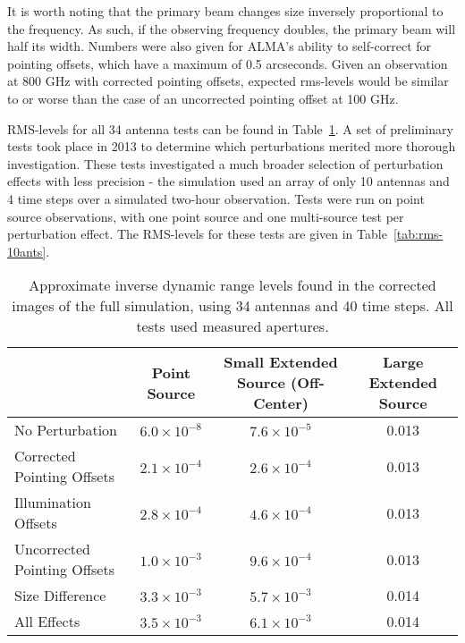 \documentclass[11pt]{article}
\begin{document}
It is worth noting that the primary beam changes size inversely proportional
to the frequency. As such, if the observing frequency doubles, the primary
beam will half its width. Numbers were also given for ALMA's ability to
self-correct for pointing offsets, which have a maximum of 0.5 arcseconds.
Given an observation at 800 GHz with corrected pointing offsets, expected 
rms-levels would be similar to or worse than the case of an uncorrected 
pointing offset at 100 GHz.

RMS-levels for all 34 antenna tests can be found in Table~\ref{tab:rms-34ants}.  
A set of preliminary tests took place in 2013 to determine which perturbations 
merited more thorough investigation. These tests investigated a much broader 
selection of perturbation effects with less precision - the simulation used an 
array of only 10 antennas and 4 time steps over a simulated two-hour 
observation. Tests were run on point source observations, with one point source 
and one multi-source test per perturbation effect. The RMS-levels for these 
tests are given in Table~\ref{tab:rms-10ants}.

\begin{table}
    \centering
    \begin{tabular}{|p{3.5cm}|c|c|c|}
    \hline
    & Point Source & Small Extended Source \linebreak (Off-Center) & Large 
    Extended Source \\
    \hline
    No Perturbation & $6.0 \times 10^{-8}$ & $7.6 \times 10^{-5}$ & 0.013 \\
    \hline
    Corrected Pointing \linebreak Offsets & $2.1 \times 10^{-4}$ & $2.6 \times 
    10^{-4}$ & 0.013 \\
    \hline
    Illumination \linebreak Offsets & $2.8 \times 10^{-4}$ & $4.6 \times 
    10^{-4}$ & 0.013 \\
    \hline
    Uncorrected \linebreak Pointing Offsets & $1.0 \times 10^{-3}$ & $9.6 
    \times 10^{-4}$ & 0.013\\
    \hline
    Size Difference & $3.3 \times 10^{-3}$ & $5.7 \times 10^{-3}$ & 0.014 \\
    \hline
    All Effects\footnotemark & $3.5 \times 10^{-3}$ & $6.1 \times 10^{-3}$ & 
    0.014 \\
    \hline
    \end{tabular}
    \caption{
         Approximate inverse dynamic range levels found in the corrected images 
         of the full simulation, using 34 antennas and 40 time steps. All tests 
         used measured apertures.
    }
    \label{tab:rms-34ants}
\end{table}
\end{document}
